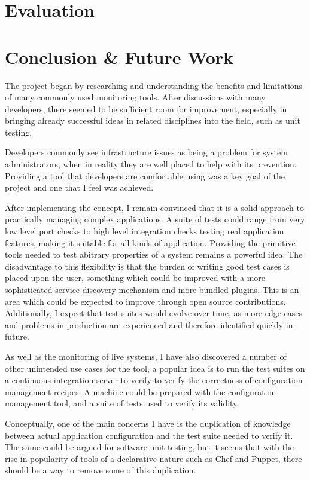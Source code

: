 \documentclass{cshonours}
\begin{document}
\chapter{Evaluation}
 \chapter{Conclusion \& Future Work}

The project began by researching and understanding the benefits and limitations of many commonly used monitoring tools. After discussions with many developers, there seemed to be sufficient room for improvement, especially in bringing already successful ideas in related disciplines into the field, such as unit testing.

Developers commonly see infrastructure issues as being a problem for system administrators, when in reality they are well placed to help with its prevention. Providing a tool that developers are comfortable using was a key goal of the project and one that I feel was achieved.

After implementing the concept, I remain convinced that it is a solid approach to practically managing complex applications. A suite of tests could range from very low level port checks to high level integration checks testing real application features, making it suitable for all kinds of application. Providing the primitive tools needed to test abitrary properties of a system remains a powerful idea. The disadvantage to this flexibility is that the burden of writing good test cases is placed upon the user, something which could be improved with a more sophisticated service discovery mechanism and more bundled plugins. This is an area which could be expected to improve through open source contributions. Additionally, I expect that test suites would evolve over time, as more edge cases and problems in production are experienced and therefore identified quickly in future.

As well as the monitoring of live systems, I have also discovered a number of other unintended use cases for the tool, a popular idea is to run the test suites on a continuous integration server to verify to verify the correctness of configuration management recipes. A machine could be prepared with the configuration management tool, and a suite of tests used to verify its validity.

Conceptually, one of the main concerns I have is the duplication of knowledge between actual application configuration and the test suite needed to verify it. The same could be argued for software unit testing, but it seems that with the rise in popularity of tools of a declarative nature such as Chef and Puppet, there should be a way to remove some of this duplication.
\end{document}
